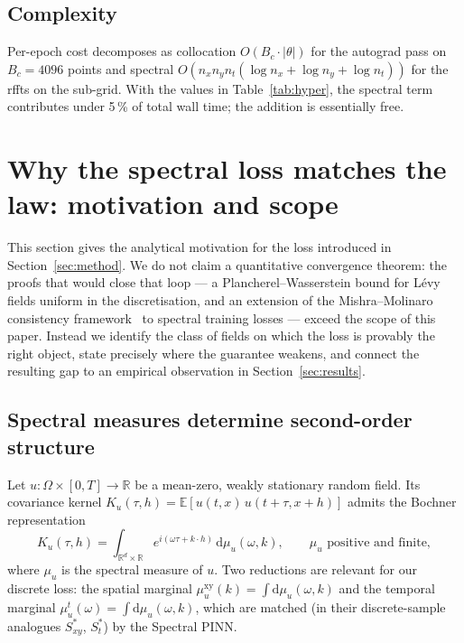 \documentclass[review,12pt]{elsarticle}
\begin{document}
\subsection{Complexity}

Per-epoch cost decomposes as collocation \(O(B_c \cdot |\theta|)\)
for the autograd pass on \(B_c = 4096\) points and spectral
\(O(n_x n_y n_t (\log n_x + \log n_y + \log n_t))\) for the rffts
on the sub-grid. With the values in Table~\ref{tab:hyper}, the
spectral term contributes under 5\,\% of total wall time; the
addition is essentially free.

\section{Why the spectral loss matches the law: motivation and scope}
\label{sec:theory}

This section gives the analytical motivation for the loss
introduced in Section~\ref{sec:method}. We do not claim a
quantitative convergence theorem: the proofs that would close that
loop --- a Plancherel--Wasserstein bound for L\'evy fields uniform
in the discretisation, and an extension of the Mishra--Molinaro
consistency
framework~\cite{MishraMolinaro2022,DeRyckMishra2022} to spectral
training losses --- exceed the scope of this paper. Instead we
identify the class of fields on which the loss is provably the
right object, state precisely where the guarantee weakens, and
connect the resulting gap to an empirical observation in
Section~\ref{sec:results}.

\subsection{Spectral measures determine second-order structure}

Let \(u : \Omega \times [0, T] \to \mathbb R\) be a mean-zero,
weakly stationary random field. Its covariance kernel
\(K_u(\tau, h) = \mathbb E[u(t,x)\,u(t+\tau, x+h)]\) admits the
Bochner representation~\cite[Thm.~9.18]{RudinRCA}
\begin{equation}
K_u(\tau, h) = \int_{\mathbb R^d \times \mathbb R}
e^{i(\omega \tau + k \cdot h)}\,\mathrm d\mu_u(\omega, k),
\qquad \mu_u\text{ positive and finite},
\label{eq:bochner}
\end{equation}
where \(\mu_u\) is the spectral measure of \(u\). Two reductions
are relevant for our discrete loss: the spatial marginal
\(\mu^{\mathrm{xy}}_u(k) = \int \mathrm d \mu_u(\omega, k)\) and
the temporal marginal
\(\mu^t_u(\omega) = \int \mathrm d \mu_u(\omega, k)\), which are
matched (in their discrete-sample analogues \(S^*_{xy}\),
\(S^*_t\)) by the Spectral PINN.
\end{document}
